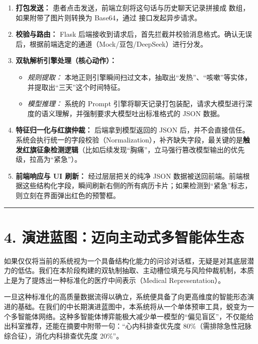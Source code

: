 \documentclass[UTF8,a4paper,12pt,fontset=none]{ctexart}
\newcommand{\inlinecode}[1]{\texttt{\detokenize{#1}}}
\begin{document}
\begin{enumerate}
\item \textbf{打包发送：} 患者点击发送，前端立刻将这句话与历史聊天记录拼接成 \inlinecode{messages} 数组，如果附带了图片则转换为 Base64，通过 \inlinecode{/api/chat} 接口发起异步请求。
\item \textbf{校验与路由：} Flask 后端接收到请求后，首先拦截并校验消息格式。确认无误后，根据前端选定的通道（Mock/豆包/DeepSeek）进行分发。
\item \textbf{双轨解析引擎处理（核心动作）：}
\begin{itemize}
\item \emph{规则提取：} 本地正则引擎瞬间扫过文本，抽取出“发热”、“咳嗽”等实体，并提取出“三天”这个时间特征。
\item \emph{模型推理：} 系统的 Prompt 引擎将聊天记录打包装配，请求大模型进行深度的语义理解，并强制要求大模型吐出标准格式的 JSON 数据。
\end{itemize}
\item \textbf{特征归一化与红旗仲裁：} 后端拿到模型返回的 JSON 后，并不会直接信任。系统会执行统一的字段校验（Normalization），补齐缺失字段，最关键的是\textbf{触发红旗征象检测逻辑}（比如后续发现“胸痛”，立马强行篡改模型输出的优先级，拉高为“紧急”）。
\item \textbf{前端响应与 UI 刷新：} 经过层层把关的纯净 JSON 数据被送回前端。前端根据这些结构化字段，瞬间刷新右侧的所有病历卡片；如果检测到“紧急”标志，则立刻在界面弹出红色的预警框。
\end{enumerate}

\vspace{0.4em}
\begin{center}\rule{0.35\linewidth}{0.4pt}\end{center}
\vspace{0.2em}

\section{4. 演进蓝图：迈向主动式多智能体生态}

如果仅仅将当前的系统视为一个具备结构化能力的问诊对话框，无疑是对其底层潜力的低估。我们在本阶段构建的双轨制抽取、主动槽位填充与风险仲裁机制，本质上是为了提炼出一种标准化的医疗中间表示（Medical Representation）。

一旦这种标准化的高质量数据流得以确立，系统便具备了向更高维度的智能形态演进的基础。在我们的中长期演进蓝图中，本系统将从一个单体预审工具，蜕变为一个多智能体网络。这种多智能体博弈能极大减少单一模型的“偏见盲区”，不仅能给出科室推荐，还能在摘要中附带一句：“心内科排查优先度 80\%（需排除急性冠脉综合征），消化内科排查优先度 20\%”。
\end{document}
